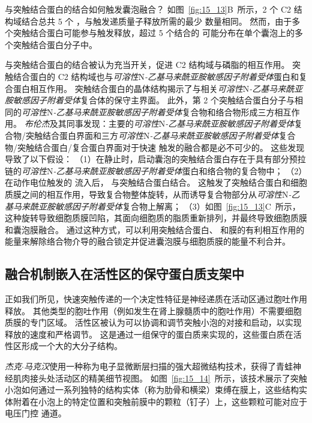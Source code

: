  与突触结合蛋白的结合如何触发囊泡融合？
如图~\ref{fig:15_13}B~所示，2 个 C2 结构域结合总共 5 个 ，与触发递质量子释放所需的最少  数量相同。
然而，由于多个突触结合蛋白可能参与触发释放，超过 5 个结合的  可能分布在单个囊泡上的多个突触结合蛋白分子中。


 与突触结合蛋白的结合被认为充当开关，促进 C2 结构域与磷脂的相互作用。
突触结合蛋白的 C2 结构域也与\textit{可溶性}N\textit{-乙基马来酰亚胺敏感因子附着受体}蛋白和复合蛋白相互作用。
突触结合蛋白的晶体结构揭示了与相关\textit{可溶性}N\textit{-乙基马来酰亚胺敏感因子附着受体}复合体的保守主界面。
此外，第 2 个突触结合蛋白分子与相同的\textit{可溶性}N\textit{-乙基马来酰亚胺敏感因子附着受体}复合物和络合物形成三方相互作用。
\textit{布伦杰}及其同事发现：主要的\textit{可溶性}N\textit{-乙基马来酰亚胺敏感因子附着受体}复合物/突触结合蛋白界面和三方\textit{可溶性}N\textit{-乙基马来酰亚胺敏感因子附着受体}复合物/突触结合蛋白/复合蛋白界面对于快速  触发的融合都是必不可少的。
这些发现导致了以下假设：
（1）在静止时，启动囊泡的突触结合蛋白存在于具有部分预拉链的\textit{可溶性}N\textit{-乙基马来酰亚胺敏感因子附着受体}蛋白和络合物的复合物中；
（2）在动作电位触发的  流入后， 与突触结合蛋白结合。
这触发了突触结合蛋白和细胞质膜之间的相互作用，导致复合物整体旋转，从而诱导复合物部分从\textit{可溶性}N\textit{-乙基马来酰亚胺敏感因子附着受体}复合物上解离；
（3）如图~\ref{fig:15_13}C~所示，这种旋转导致细胞质膜凹陷，其面向细胞质的脂质重新排列，并最终导致细胞质膜和囊泡膜融合。
通过这种方式，可以利用突触结合蛋白、 和膜的有利相互作用的能量来解除络合物介导的融合锁定并促进囊泡膜与细胞质膜的能量不利合并。



\subsection{融合机制嵌入在活性区的保守蛋白质支架中}

正如我们所见，快速突触传递的一个决定性特征是神经递质在活动区通过胞吐作用释放。
其他类型的胞吐作用（例如发生在肾上腺髓质中的胞吐作用）不需要细胞质膜的专门区域。
活性区被认为可以协调和调节突触小泡的对接和启动，以实现释放的速度和严格调节。
这是通过一组保守的蛋白质来实现的，这些蛋白质在活性区形成一个大的大分子结构。


\textit{杰克$\cdot$马克汉}使用一种称为电子显微断层扫描的强大超微结构技术，获得了青蛙神经肌肉接头处活动区的精美细节视图。
如图~\ref{fig:15_14}~所示，该技术展示了突触小泡如何通过一系列独特的结构实体（称为肋骨和横梁）束缚在膜上，这些结构实体附着在小泡上的特定位置和突触前膜中的颗粒（钉子）上，这些颗粒可能对应于电压门控  通道。


